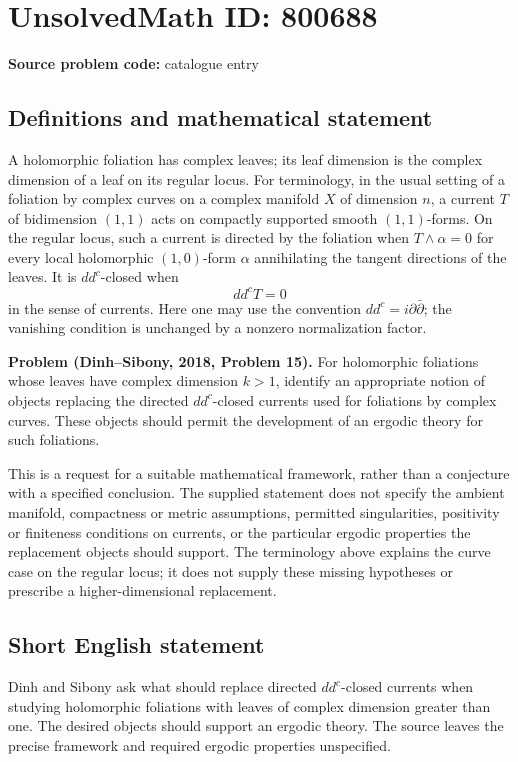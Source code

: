 \documentclass[11pt]{article}
\begin{document}
\section*{UnsolvedMath ID: 800688}
\textbf{Source problem code:} catalogue entry
\subsection{Definitions and mathematical statement}
A holomorphic foliation has complex leaves; its leaf dimension is the complex dimension of a leaf on its regular locus. For terminology, in the usual setting of a foliation by complex curves on a complex manifold \(X\) of dimension \(n\), a current \(T\) of bidimension \((1,1)\) acts on compactly supported smooth \((1,1)\)-forms. On the regular locus, such a current is directed by the foliation when \(T\wedge\alpha=0\) for every local holomorphic \((1,0)\)-form \(\alpha\) annihilating the tangent directions of the leaves. It is \(dd^c\)-closed when
\[
 dd^cT=0
\]
in the sense of currents. Here one may use the convention \(dd^c=i\partial\bar\partial\); the vanishing condition is unchanged by a nonzero normalization factor.

\textbf{Problem (Dinh--Sibony, 2018, Problem 15).} For holomorphic foliations whose leaves have complex dimension \(k>1\), identify an appropriate notion of objects replacing the directed \(dd^c\)-closed currents used for foliations by complex curves. These objects should permit the development of an ergodic theory for such foliations.

This is a request for a suitable mathematical framework, rather than a conjecture with a specified conclusion. The supplied statement does not specify the ambient manifold, compactness or metric assumptions, permitted singularities, positivity or finiteness conditions on currents, or the particular ergodic properties the replacement objects should support. The terminology above explains the curve case on the regular locus; it does not supply these missing hypotheses or prescribe a higher-dimensional replacement.
\subsection{Short English statement}
Dinh and Sibony ask what should replace directed \(dd^c\)-closed currents when studying holomorphic foliations with leaves of complex dimension greater than one. The desired objects should support an ergodic theory. The source leaves the precise framework and required ergodic properties unspecified.
\end{document}
